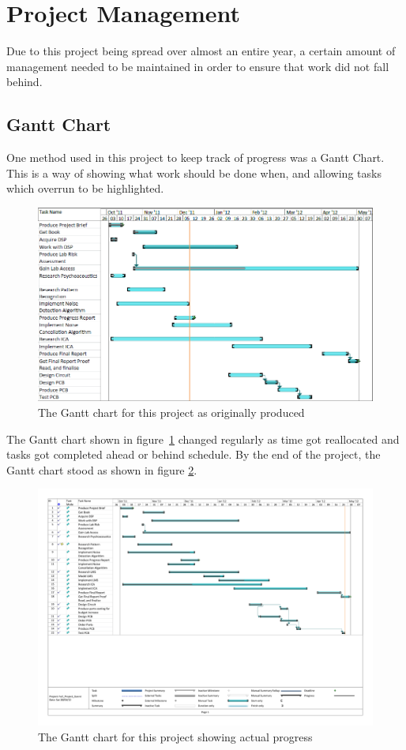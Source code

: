 \section{Project Management}
Due to this project being spread over almost an entire year, a certain amount of management needed to be maintained in order to ensure that work did not fall behind.

\subsection{Gantt Chart}
One method used in this project to keep track of progress was a Gantt Chart.
This is a way of showing what work should be done when, and allowing tasks which overrun to be highlighted.
\\
\begin{figure}
	\centering
	\includegraphics[width=\textwidth]{./img/ganntori.png}
	\caption{The Gantt chart for this project as originally produced}
	\label{fig:gannt}
\end{figure}

\noindent
The Gantt chart shown in figure~\ref{fig:gannt} changed regularly as time got reallocated and tasks got completed ahead or behind schedule.
By the end of the project, the Gantt chart stood as shown in figure \ref{fig:newgannt}.
\\
\begin{figure}
	\centering
	\includegraphics[width=\textwidth]{./img/Full_Project_Gannt_final.pdf}
	\caption{The Gantt chart for this project showing actual progress}
	\label{fig:newgannt}
\end{figure}

